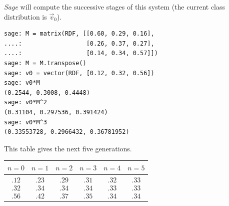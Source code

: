 \textit{Sage} will compute the successive stages of this system
(the current class distribution is $\vec{v}_0$).
\begin{lstlisting}
sage: M = matrix(RDF, [[0.60, 0.29, 0.16],
....:                  [0.26, 0.37, 0.27],
....:                  [0.14, 0.34, 0.57]])
sage: M = M.transpose()
sage: v0 = vector(RDF, [0.12, 0.32, 0.56])
sage: v0*M
(0.2544, 0.3008, 0.4448)
sage: v0*M^2
(0.31104, 0.297536, 0.391424)
sage: v0*M^3
(0.33553728, 0.2966432, 0.36781952)  
\end{lstlisting}
This table gives the next five generations.
\begin{center}
  \begin{tabular}{c|ccccc}
    $n=0$  &$n=1$  &$n=2$  &$n=3$  &$n=4$  &$n=5$  \\ \hline
    $\begin{array}{l}
               .12 \\ .32  \\ .56
      \end{array}$
    &$\begin{array}{l}
               .23 \\ .34  \\ .42
       \end{array}$
    &$\begin{array}{l}
               .29 \\ .34  \\ .37  
       \end{array}$
    &$\begin{array}{l}
               .31 \\ .34  \\ .35  
       \end{array}$
    &$\begin{array}{l}
               .32 \\ .33 \\ .34  
       \end{array}$
    &$\begin{array}{l}
               .33 \\ .33  \\ .34  
       \end{array}$
  \end{tabular}
\end{center}

